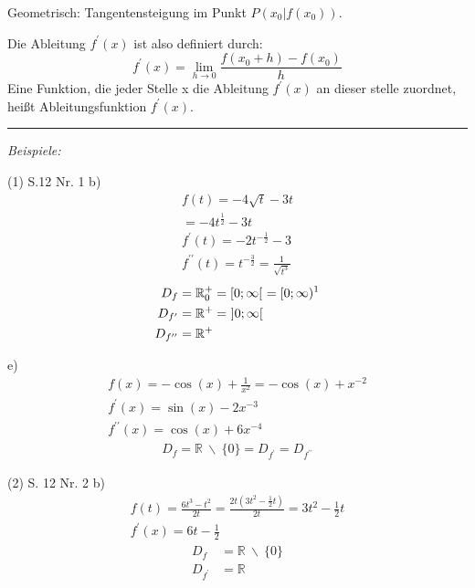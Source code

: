 Geometrisch: Tangentensteigung im Punkt $P(x_0|f(x_0))$.

Die Ableitung $f^{\prime}(x)$ ist also definiert durch:
$$f^{\prime}(x)=\lim_{h\to 0} \frac{f(x_{0}+h)-f(x_{0})}{h}$$
Eine Funktion, die jeder Stelle x die Ableitung $f^{\prime}(x)$ an dieser stelle zuordnet, heißt Ableitungsfunktion $f^{\prime}(x)$.

\noindent\rule{\textwidth}{1pt}

\textit{Beispiele:}

(1) S.12 Nr. 1 b)
\begin{equation*}
\begin{gathered}
    f(t)  = -4\sqrt{t}-3t \\
    = -4t^{\frac{1}{2}}-3t \\
    f^{\prime}(t)  = -2t^{-\frac{1}{2}}-3 \\
    f^{\prime\prime}(t)  = t^{-\frac{3}{2}} = \frac{1}{\sqrt{t^3}}
\end{gathered}
\end{equation*}
\begin{align*}
    D_f & = \mathbb{R}_0^+ = [0;\infty[ \ = [0;\infty) \text{\footnotemark}\\
    D_{f^\prime} & = \mathbb{R}^+ = \ ]0;\infty[ \\
    D_{f^{\prime\prime}} & = \mathbb{R}^+
\end{align*}

e)
\begin{equation*}
    \begin{gathered}
        f(x)  = -\cos(x) + \frac{1}{x^2} = -\cos(x)+x^{-2} \\
    f^{\prime}(x)  = \sin(x) -2x^{-3} \\
    f^{\prime\prime}(x)  = \cos(x)+6x^{-4}
    \end{gathered}
\end{equation*}
\begin{align*}
    D_f = \mathbb{R} \ \backslash \ \{0\} = D_{f^{\prime}} = D_{f^{\prime\prime}}
\end{align*}

(2) S. 12 Nr. 2 b)
\begin{equation*}
    \begin{gathered}
        f(t)  = \frac{6t^3-t^2}{2t} = \frac{2t(3t^2 - \frac{1}{2}t)}{2t} = 3t^2 - \frac{1}{2}t \\
        f^{\prime}(x)  = 6t - \frac{1}{2}
    \end{gathered}
\end{equation*}
\begin{align*}
    D_f & = \mathbb{R} \ \backslash \ \{0\}  \\
    D_{f^{\prime}} & = \mathbb{R}
\end{align*}

